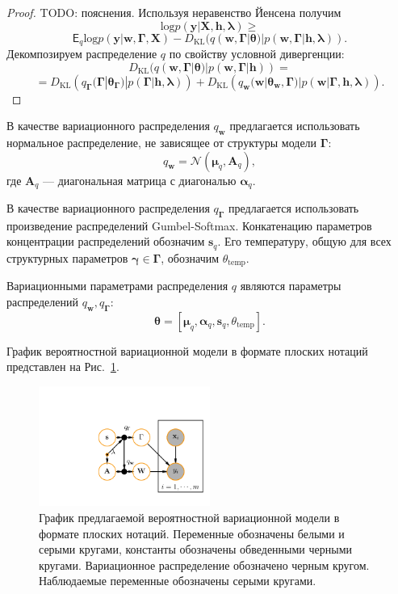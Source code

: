 \begin{proof}
TODO: пояснения.
Используя неравенство Йенсена получим 
\[
\text{log} p(\mathbf{y}|\mathbf{X}, \mathbf{h}, \boldsymbol{\lambda}) \geq
\]
\[
   \mathsf{E}_{q} \text{log}p(\mathbf{y}|\mathbf{w}, \boldsymbol{\Gamma}, \mathbf{X})-D_\text{KL}(q (\mathbf{w},\boldsymbol{\Gamma}|\boldsymbol{\theta})|p(\mathbf{w},\boldsymbol{\Gamma}|\mathbf{h}, \boldsymbol{\lambda})).
\]
Декомпозируем распределение $q$ по свойству условной дивергенции:
\[
D_\text{KL}(q (\mathbf{w},\boldsymbol{\Gamma}|\boldsymbol{\theta})|p(\mathbf{w},\boldsymbol{\Gamma}|\mathbf{h})) = 
\]
\[
=D_\text{KL}\left(q_{\boldsymbol{\Gamma}}(\boldsymbol{\Gamma}|\boldsymbol{\theta}_{\boldsymbol{\Gamma}})|p(\boldsymbol{\Gamma}|\mathbf{h}, \boldsymbol{\lambda})\right)+D_\text{KL}\left(q_{\mathbf{w}}(\mathbf{w}|\boldsymbol{\theta}_\mathbf{w},\boldsymbol{\Gamma})|p(\mathbf{w}|\boldsymbol{\Gamma}, \mathbf{h}, \boldsymbol{\lambda})\right).    
\]
\end{proof}
В качестве вариационного распределения $q_{\mathbf{w}}$ предлагается использовать нормальное распределение, не зависящее от структуры модели $\boldsymbol{\Gamma}$:
\[
    q_{\mathbf{w}} = \mathcal{N}(\boldsymbol{\mu}_q, \mathbf{A}_q), 
\]
где $\mathbf{A}_q$ --- диагональная матрица с диагональю $\boldsymbol{\alpha}_q$.

В качестве вариационного распределения $q_{\boldsymbol{\Gamma}}$ предлагается использовать произведение распределений Gumbel-Softmax. Конкатенацию параметров концентрации распределений обозначим $\mathbf{s}_q$. Его температуру, общую для всех структурных параметров $\boldsymbol{\gamma} \in \boldsymbol{\Gamma}$, обозначим $\theta_\text{temp}$.

Вариационными параметрами распределения $q$ являются параметры распределений $q_{\mathbf{w}}, q_{\boldsymbol{\Gamma}}$:
\[\boldsymbol{\theta}=[\boldsymbol{\mu}_q, \boldsymbol{\alpha}_q,\mathbf{s}_q, \theta_\text{temp}]. 
\]


График вероятностной вариационной модели в формате плоских нотаций представлен на Рис.~\ref{fig:plate_qprob}.
\begin{figure}
\centering
   \includegraphics[width=0.5\textwidth]{plots/notebooks/plate.pdf}
\caption{График предлагаемой вероятностной вариационной модели в формате плоских нотаций. Переменные обозначены белыми и серыми кругами, константы обозначены обведенными черными кругами. Вариационное распределение обозначено черным кругом. Наблюдаемые переменные обозначены серыми кругами.}
\label{fig:plate_qprob}
\end{figure}

